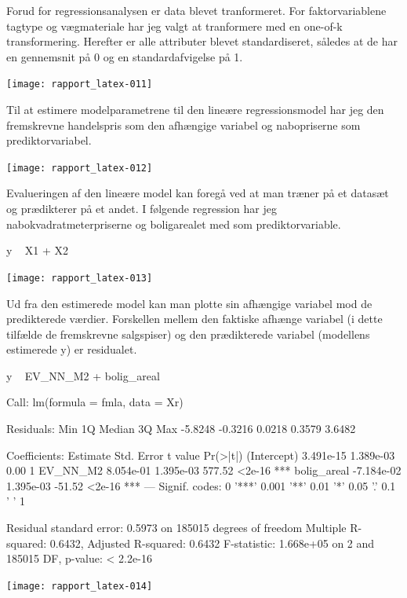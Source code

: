 \documentclass{report}
\begin{document}
Forud for regressionsanalysen er data blevet tranformeret. For faktorvariablene tagtype og vægmateriale har jeg valgt at tranformere med en one-of-k transformering. Herefter er alle attributer blevet standardiseret, således at de har en gennemsnit på 0 og en standardafvigelse på 1. 

\texttt{[image: rapport\_latex-011]}

Til at estimere modelparametrene til den lineære regressionsmodel har jeg den fremskrevne handelspris som den afhængige variabel og nabopriserne som prediktorvariabel. 

\texttt{[image: rapport\_latex-012]}

Evalueringen af den lineære model kan foregå ved at man træner på et datasæt og prædikterer på et andet. I følgende regression har jeg nabokvadratmeterpriserne og boligarealet med som prediktorvariable. 

\begin{Schunk}
\begin{Soutput}
y ~ X1 + X2
\end{Soutput}
\end{Schunk}
\texttt{[image: rapport\_latex-013]}

Ud fra den estimerede model kan man plotte sin afhængige variabel mod de predikterede værdier.
Forskellen mellem den faktiske afhænge variabel (i dette tilfælde de fremskrevne salgspiser) og den prædikterede variabel (modellens estimerede y) er residualet.

\begin{Schunk}
\begin{Soutput}
y ~ EV_NN_M2 + bolig_areal
\end{Soutput}
\begin{Soutput}
Call:
lm(formula = fmla, data = Xr)

Residuals:
    Min      1Q  Median      3Q     Max 
-5.8248 -0.3216  0.0218  0.3579  3.6482 

Coefficients:
              Estimate Std. Error t value Pr(>|t|)    
(Intercept)  3.491e-15  1.389e-03    0.00        1    
EV_NN_M2     8.054e-01  1.395e-03  577.52   <2e-16 ***
bolig_areal -7.184e-02  1.395e-03  -51.52   <2e-16 ***
---
Signif. codes:  0 '***' 0.001 '**' 0.01 '*' 0.05 '.' 0.1 ' ' 1

Residual standard error: 0.5973 on 185015 degrees of freedom
Multiple R-squared:  0.6432,	Adjusted R-squared:  0.6432 
F-statistic: 1.668e+05 on 2 and 185015 DF,  p-value: < 2.2e-16
\end{Soutput}
\end{Schunk}
\texttt{[image: rapport\_latex-014]}
\end{document}
